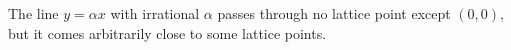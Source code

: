 The line $y = \alpha x$ with irrational $\alpha$ passes through no lattice point except $(0, 0)$, but it comes arbitrarily close to some lattice points.
